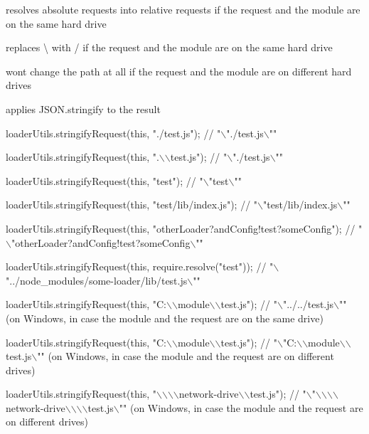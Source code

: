 \begin{DoxyItemize}
\item resolves absolute requests into relative requests if the request and the module are on the same hard drive
\item replaces {\ttfamily \textbackslash{}} with {\ttfamily /} if the request and the module are on the same hard drive
\item won\textquotesingle{}t change the path at all if the request and the module are on different hard drives
\item applies {\ttfamily J\+S\+O\+N.\+stringify} to the result
\end{DoxyItemize}


\begin{DoxyCode}
loaderUtils.stringifyRequest(this, "./test.js");
// "\(\backslash\)"./test.js\(\backslash\)""

loaderUtils.stringifyRequest(this, ".\(\backslash\)\(\backslash\)test.js");
// "\(\backslash\)"./test.js\(\backslash\)""

loaderUtils.stringifyRequest(this, "test");
// "\(\backslash\)"test\(\backslash\)""

loaderUtils.stringifyRequest(this, "test/lib/index.js");
// "\(\backslash\)"test/lib/index.js\(\backslash\)""

loaderUtils.stringifyRequest(this, "otherLoader?andConfig!test?someConfig");
// "\(\backslash\)"otherLoader?andConfig!test?someConfig\(\backslash\)""

loaderUtils.stringifyRequest(this, require.resolve("test"));
// "\(\backslash\)"../node\_modules/some-loader/lib/test.js\(\backslash\)""

loaderUtils.stringifyRequest(this, "C:\(\backslash\)\(\backslash\)module\(\backslash\)\(\backslash\)test.js");
// "\(\backslash\)"../../test.js\(\backslash\)"" (on Windows, in case the module and the request are on the same drive)

loaderUtils.stringifyRequest(this, "C:\(\backslash\)\(\backslash\)module\(\backslash\)\(\backslash\)test.js");
// "\(\backslash\)"C:\(\backslash\)\(\backslash\)module\(\backslash\)\(\backslash\)test.js\(\backslash\)"" (on Windows, in case the module and the request are on different drives)

loaderUtils.stringifyRequest(this, "\(\backslash\)\(\backslash\)\(\backslash\)\(\backslash\)network-drive\(\backslash\)\(\backslash\)test.js");
// "\(\backslash\)"\(\backslash\)\(\backslash\)\(\backslash\)\(\backslash\)network-drive\(\backslash\)\(\backslash\)\(\backslash\)\(\backslash\)test.js\(\backslash\)"" (on Windows, in case the module and the request are on different
       drives)
\end{DoxyCode}


